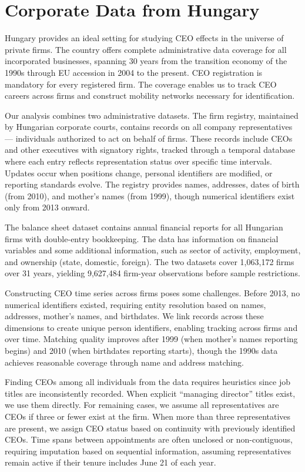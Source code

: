 \documentclass[11pt,a4paper]{article}
\begin{document}
\section{Corporate Data from Hungary}

Hungary provides an ideal setting for studying CEO effects in the universe of private firms. The country offers complete administrative data coverage for all incorporated businesses, spanning 30 years from the transition economy of the 1990s through EU accession in 2004 to the present. CEO registration is mandatory for every registered firm. The coverage enables us to track CEO careers across firms and construct mobility networks necessary for identification.

Our analysis combines two administrative datasets. The firm registry, maintained by Hungarian corporate courts, contains records on all company representatives — individuals authorized to act on behalf of firms. These records include CEOs and other executives with signatory rights, tracked through a temporal database where each entry reflects representation status over specific time intervals. Updates occur when positions change, personal identifiers are modified, or reporting standards evolve. The registry provides names, addresses, dates of birth (from 2010), and mother's names (from 1999), though numerical identifiers exist only from 2013 onward.

The balance sheet dataset contains annual financial reports for all Hungarian firms with double-entry bookkeeping. The data has information on financial variables and some additional information, such as sector of activity, employment, and ownership (state, domestic, foreign). The two datasets cover 1,063,172 firms over 31 years, yielding 9,627,484 firm-year observations before sample restrictions.

Constructing CEO time series across firms poses some challenges. Before 2013, no numerical identifiers existed, requiring entity resolution based on names, addresses, mother's names, and birthdates. We link records across these dimensions to create unique person identifiers, enabling tracking across firms and over time. Matching quality improves after 1999 (when mother's names reporting begins) and 2010 (when birthdates reporting starts), though the 1990s data achieves reasonable coverage through name and address matching. 

Finding CEOs among all individuals from the data requires heuristics since job titles are inconsistently recorded. When explicit ``managing director'' titles exist, we use them directly. For remaining cases, we assume all representatives are CEOs if three or fewer exist at the firm. When more than three representatives are present, we assign CEO status based on continuity with previously identified CEOs. Time spans between appointments are often unclosed or non-contiguous, requiring imputation based on sequential information, assuming representatives remain active if their tenure includes June 21 of each year.
\end{document}
